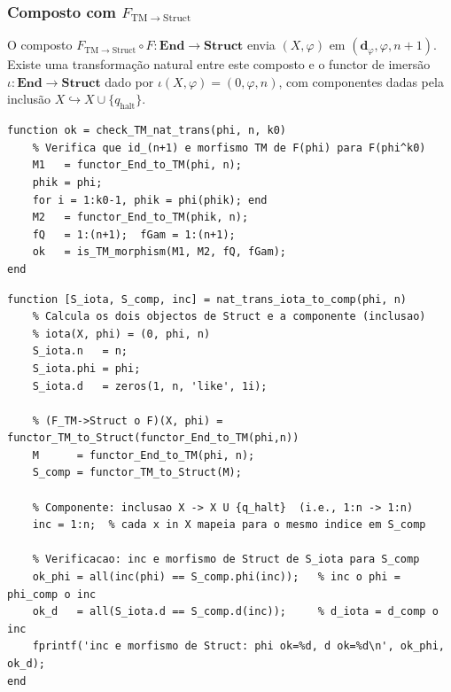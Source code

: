 \subsubsection{Composto com $F_{\mathrm{TM} \to \mathrm{Struct}}$}

O composto $F_{\mathrm{TM} \to \mathrm{Struct}} \circ F: \mathbf{End} \to \mathbf{Struct}$ envia $(X, \varphi)$ em $(\mathbf{d}_\varphi, \varphi, n{+}1)$. Existe uma transformação natural entre este composto e o functor de imersão $\iota: \mathbf{End} \to \mathbf{Struct}$ dado por $\iota(X,\varphi) = (0, \varphi, n)$, com componentes dadas pela inclusão $X \hookrightarrow X \cup \{q_{\mathrm{halt}}\}$.

\begin{lstlisting}[style=matlab, caption={Verificação da naturalidade $\eta^{(k_0)}: F \Rightarrow F^{(k_0)}$ em $\mathbf{End} \to \mathbf{TM}$}]
function ok = check_TM_nat_trans(phi, n, k0)
    % Verifica que id_(n+1) e morfismo TM de F(phi) para F(phi^k0)
    M1   = functor_End_to_TM(phi, n);
    phik = phi;
    for i = 1:k0-1, phik = phi(phik); end
    M2   = functor_End_to_TM(phik, n);
    fQ   = 1:(n+1);  fGam = 1:(n+1);
    ok   = is_TM_morphism(M1, M2, fQ, fGam);
end
\end{lstlisting}

\begin{lstlisting}[style=matlab, caption={Componente da transformação natural $\iota \Rightarrow F_{\mathrm{TM} \to \mathrm{Struct}} \circ F$ em $(X,\varphi)$}]
function [S_iota, S_comp, inc] = nat_trans_iota_to_comp(phi, n)
    % Calcula os dois objectos de Struct e a componente (inclusao)
    % iota(X, phi) = (0, phi, n)
    S_iota.n   = n;
    S_iota.phi = phi;
    S_iota.d   = zeros(1, n, 'like', 1i);

    % (F_TM->Struct o F)(X, phi) = functor_TM_to_Struct(functor_End_to_TM(phi,n))
    M      = functor_End_to_TM(phi, n);
    S_comp = functor_TM_to_Struct(M);

    % Componente: inclusao X -> X U {q_halt}  (i.e., 1:n -> 1:n)
    inc = 1:n;  % cada x in X mapeia para o mesmo indice em S_comp

    % Verificacao: inc e morfismo de Struct de S_iota para S_comp
    ok_phi = all(inc(phi) == S_comp.phi(inc));   % inc o phi = phi_comp o inc
    ok_d   = all(S_iota.d == S_comp.d(inc));     % d_iota = d_comp o inc
    fprintf('inc e morfismo de Struct: phi ok=%d, d ok=%d\n', ok_phi, ok_d);
end
\end{lstlisting}
